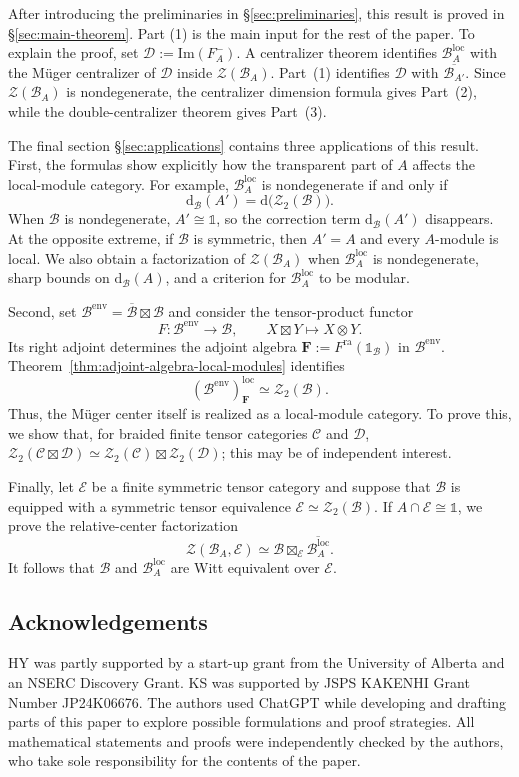 \documentclass[10pt,a4paper]{amsart}
\numberwithin{equation}{section}
\newcommand{\unit}{\mathds{1}}
\newcommand{\B}{\mathcal{B}}
\newcommand{\C}{\mathcal{C}}
\newcommand{\D}{\mathcal{D}}
\newcommand{\E}{\mathcal{E}}
\newcommand{\Z}{\mathcal{Z}}
\newcommand{\loc}{\mathrm{loc}}
\newcommand{\ra}{\mathrm{ra}}
\newcommand{\im}{\mathrm{Im}}
\newcommand{\FP}{\mathrm{d}}
\newcommand{\oB}{\overline{\B}}
\newcommand{\bF}{\mathbf{F}}
\begin{document}
After introducing the preliminaries in \S\ref{sec:preliminaries}, this result is proved in \S\ref{sec:main-theorem}.  
Part (1) is the main input for the rest of the paper. To explain the proof, set
$\D:=\im(F_A^-)$. A centralizer theorem identifies $\B_A^{\loc}$ with the
M\"uger centralizer of $\D$ inside $\Z(\B_A)$. Part~(1) identifies
$\D$ with $\overline{\B_{A'}}$. Since $\Z(\B_A)$ is nondegenerate, the
centralizer dimension formula gives Part~(2), while the double-centralizer
theorem gives Part~(3).

The final section \S\ref{sec:applications} contains three applications of this result. First,
the formulas show explicitly how the transparent part of $A$ affects the
local-module category. For example, $\B_A^{\loc}$ is nondegenerate if and
only if
\[
  \FP_{\B}(A')=\FP\bigl(\Z_2(\B)\bigr).
\]
When $\B$ is nondegenerate, $A'\cong\unit$, so the correction term
$\FP_{\B}(A')$ disappears. At the opposite extreme, if $\B$ is symmetric,
then $A'=A$ and every $A$-module is local. We also obtain a factorization of
$\Z(\B_A)$ when $\B_A^{\loc}$ is nondegenerate, sharp bounds on
$\FP_{\B}(A)$, and a criterion for $\B_A^{\loc}$ to be modular. 

Second, set $\mathcal{B}^{\mathrm{env}} =\oB\boxtimes\B$ and consider the tensor-product
functor
\[
  F:\B^{\mathrm{env}}\longrightarrow\B,
  \qquad
  X\boxtimes Y\longmapsto X\otimes Y.
\]
Its right adjoint determines the adjoint algebra $\bF:=F^\ra(\unit_\B)$ in
$\B^{\mathrm{env}}$. Theorem~\ref{thm:adjoint-algebra-local-modules}
identifies
\[
  (\B^{\mathrm{env}})_\bF^{\loc}
  \simeq
  \Z_2(\B).
\]
Thus, the M\"uger center itself is realized as a local-module category. To prove this, we show that, for braided finite tensor
categories $\C$ and $\D$, $\Z_2(\C\boxtimes\D) \simeq \Z_2(\C)\boxtimes\Z_2(\D)$; this may be of independent interest.

Finally, let $\E$ be a finite symmetric tensor category and suppose that
$\B$ is equipped with a symmetric tensor equivalence
$\E\simeq\Z_2(\B)$. If $A\cap\E\cong\unit$, we prove the relative-center
factorization
\[
  \Z(\B_A,\E)
  \simeq
  \B\boxtimes_{\E}\overline{\B_A^{\loc}}.
\]
It follows that $\B$ and $\B_A^{\loc}$ are Witt equivalent over $\E$.


\subsection*{Acknowledgements}
HY was partly supported by a start-up grant from the University of Alberta and an NSERC Discovery Grant. KS was supported by JSPS KAKENHI Grant Number JP24K06676. The authors used ChatGPT while developing and drafting parts of this paper to explore possible formulations and proof strategies. All mathematical statements and proofs were independently checked by the authors, who take sole responsibility for the contents of the paper.
\end{document}
